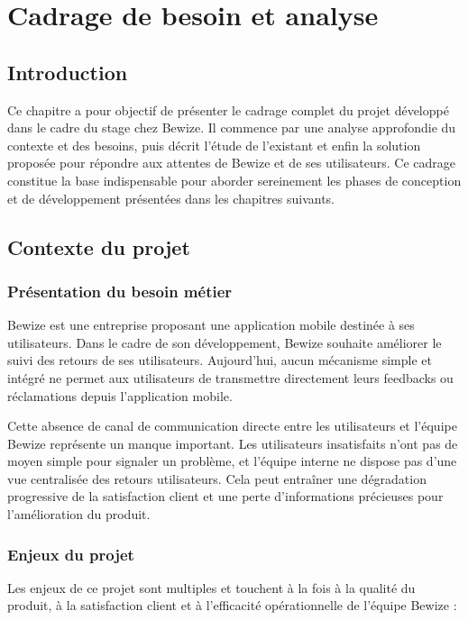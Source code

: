 \chapter{Cadrage de besoin et analyse}

\section{Introduction}
Ce chapitre a pour objectif de présenter le cadrage complet du projet 
développé dans le cadre du stage chez Bewize. Il commence par une analyse 
approfondie du contexte et des besoins, puis décrit l'étude de l'existant 
et enfin la solution proposée pour répondre aux attentes de Bewize et 
de ses utilisateurs. Ce cadrage constitue la base indispensable pour 
aborder sereinement les phases de conception et de développement 
présentées dans les chapitres suivants.

\section{Contexte du projet}

\subsection{Présentation du besoin métier}
Bewize est une entreprise proposant une application mobile destinée à 
ses utilisateurs. Dans le cadre de son développement, Bewize souhaite 
améliorer le suivi des retours de ses utilisateurs. Aujourd'hui, aucun 
mécanisme simple et intégré ne permet aux utilisateurs de transmettre 
directement leurs feedbacks ou réclamations depuis l'application mobile.

Cette absence de canal de communication directe entre les utilisateurs 
et l'équipe Bewize représente un manque important. Les utilisateurs 
insatisfaits n'ont pas de moyen simple pour signaler un problème, et 
l'équipe interne ne dispose pas d'une vue centralisée des retours 
utilisateurs. Cela peut entraîner une dégradation progressive de la 
satisfaction client et une perte d'informations précieuses pour 
l'amélioration du produit.

\subsection{Enjeux du projet}
Les enjeux de ce projet sont multiples et touchent à la fois à la qualité 
du produit, à la satisfaction client et à l'efficacité opérationnelle 
de l'équipe Bewize :

